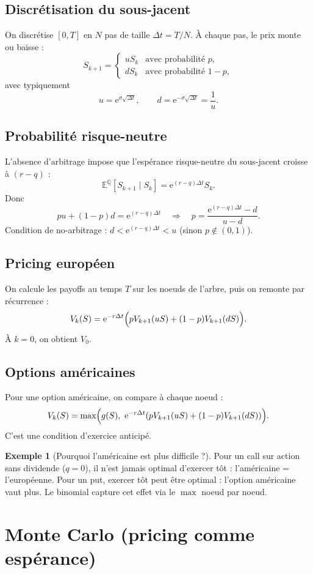 \documentclass[11pt,a4paper]{report}
\newcommand{\ee}{\mathrm{e}}
\newcommand{\E}{\mathbb{E}}
\newcommand{\Q}{\mathbb{Q}}
\newcommand{\1}{\mathbbm{1}}
\theoremstyle{definition}
\newtheorem{example}{Exemple}[chapter]
\theoremstyle{plain}
\theoremstyle{remark}
\begin{document}
\subsection{Discrétisation du sous-jacent}
On discrétise $[0,T]$ en $N$ pas de taille $\Delta t = T/N$.
À chaque pas, le prix monte ou baisse :
\[
S_{k+1} =
\begin{cases}
u S_k & \text{avec probabilité } p,\\
d S_k & \text{avec probabilité } 1-p,
\end{cases}
\]
avec typiquement
\[
u=\ee^{\sigma\sqrt{\Delta t}},\qquad d=\ee^{-\sigma\sqrt{\Delta t}}=\frac{1}{u}.
\]

\subsection{Probabilité risque-neutre}
L'absence d'arbitrage impose que l'espérance risque-neutre du sous-jacent croisse à $(r-q)$ :
\[
\E^\Q[S_{k+1}\mid S_k] = \ee^{(r-q)\Delta t}S_k.
\]
Donc
\[
p u + (1-p)d = \ee^{(r-q)\Delta t}
\quad\Longrightarrow\quad
p = \frac{\ee^{(r-q)\Delta t}-d}{u-d}.
\]
Condition de no-arbitrage : $d < \ee^{(r-q)\Delta t} < u$ (sinon $p\notin(0,1)$).

\subsection{Pricing européen}
On calcule les payoffs au temps $T$ sur les noeuds de l'arbre,
puis on remonte par récurrence :
\[
V_k(S)=\ee^{-r\Delta t}\Bigl(p V_{k+1}(uS) + (1-p)V_{k+1}(dS)\Bigr).
\]
À $k=0$, on obtient $V_0$.

\subsection{Options américaines}
Pour une option américaine, on compare à chaque noeud :
\[
V_k(S)=\max\Bigl(g(S),\ \ee^{-r\Delta t}(p V_{k+1}(uS)+(1-p)V_{k+1}(dS))\Bigr).
\]
C'est une condition d'exercice anticipé.

\begin{example}[Pourquoi l'américaine est plus difficile ?]
Pour un call sur action sans dividende ($q=0$), il n'est jamais optimal d'exercer tôt :
l'américaine = l'européenne.
Pour un put, exercer tôt peut être optimal : l'option américaine vaut plus.
Le binomial capture cet effet via le $\max$ noeud par noeud.
\end{example}

\section{Monte Carlo (pricing comme espérance)}
\label{sec:mc}
\end{document}
